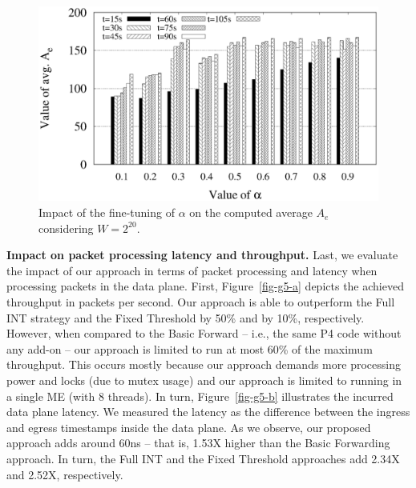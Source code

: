 \begin{figure}[!htb]
\centering
\includegraphics[scale=0.35]{results/g3.eps}
\caption{Impact of the fine-tuning of $\alpha$ on the computed average $A_e$ considering $W=2^{20}$.}
\label{fig-results3}
\end{figure}

\noindent \textbf{Impact on packet processing latency and throughput.} Last, we evaluate the impact of our approach in terms of packet processing and latency when processing packets in the data plane. First, Figure~\ref{fig-g5-a} depicts the achieved throughput in packets per second. Our approach is able to outperform the Full INT strategy and the Fixed Threshold by 50\% and by 10\%, respectively. However, when compared to the Basic Forward -- i.e., the same P4 code without any add-on -- our approach is limited to run at most 60\% of the maximum throughput. This occurs mostly because our approach demands more processing power and locks (due to mutex usage) and our approach is limited to running in a single ME (with 8 threads). In turn, Figure~\ref{fig-g5-b} illustrates the incurred data plane latency. We measured the latency as the difference between the ingress and egress timestamps inside the data plane. As we observe, our proposed approach adds around 60ns -- that is,  1.53X higher than the Basic Forwarding approach. In turn, the Full INT and the Fixed Threshold  approaches add 2.34X and 2.52X, respectively. 

